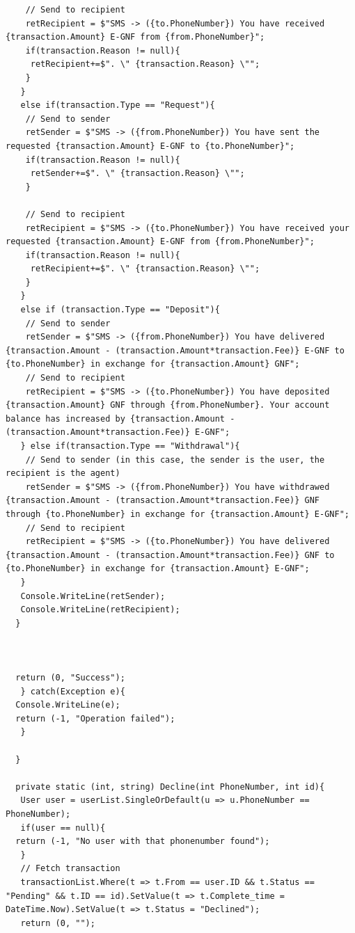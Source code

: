 \documentclass[11pt, a4paper]{article}
\begin{document}
\begin{appendices}
\begin{lstlisting}
    // Send to recipient
    retRecipient = $"SMS -> ({to.PhoneNumber}) You have received {transaction.Amount} E-GNF from {from.PhoneNumber}";
    if(transaction.Reason != null){
     retRecipient+=$". \" {transaction.Reason} \"";
    }
   }
   else if(transaction.Type == "Request"){
    // Send to sender
    retSender = $"SMS -> ({from.PhoneNumber}) You have sent the requested {transaction.Amount} E-GNF to {to.PhoneNumber}";
    if(transaction.Reason != null){
     retSender+=$". \" {transaction.Reason} \"";
    }

    // Send to recipient
    retRecipient = $"SMS -> ({to.PhoneNumber}) You have received your requested {transaction.Amount} E-GNF from {from.PhoneNumber}";
    if(transaction.Reason != null){
     retRecipient+=$". \" {transaction.Reason} \"";
    }
   }
   else if (transaction.Type == "Deposit"){
    // Send to sender
    retSender = $"SMS -> ({from.PhoneNumber}) You have delivered {transaction.Amount - (transaction.Amount*transaction.Fee)} E-GNF to {to.PhoneNumber} in exchange for {transaction.Amount} GNF";
    // Send to recipient
    retRecipient = $"SMS -> ({to.PhoneNumber}) You have deposited {transaction.Amount} GNF through {from.PhoneNumber}. Your account balance has increased by {transaction.Amount - (transaction.Amount*transaction.Fee)} E-GNF";
   } else if(transaction.Type == "Withdrawal"){
    // Send to sender (in this case, the sender is the user, the recipient is the agent)
    retSender = $"SMS -> ({from.PhoneNumber}) You have withdrawed {transaction.Amount - (transaction.Amount*transaction.Fee)} GNF through {to.PhoneNumber} in exchange for {transaction.Amount} E-GNF";
    // Send to recipient
    retRecipient = $"SMS -> ({to.PhoneNumber}) You have delivered {transaction.Amount - (transaction.Amount*transaction.Fee)} GNF to {to.PhoneNumber} in exchange for {transaction.Amount} E-GNF";
   }
   Console.WriteLine(retSender);
   Console.WriteLine(retRecipient);
  }



  return (0, "Success");
   } catch(Exception e){
  Console.WriteLine(e);
  return (-1, "Operation failed");
   }

  }

  private static (int, string) Decline(int PhoneNumber, int id){
   User user = userList.SingleOrDefault(u => u.PhoneNumber == PhoneNumber);
   if(user == null){
  return (-1, "No user with that phonenumber found");
   }
   // Fetch transaction
   transactionList.Where(t => t.From == user.ID && t.Status == "Pending" && t.ID == id).SetValue(t => t.Complete_time = DateTime.Now).SetValue(t => t.Status = "Declined");
   return (0, "");


\end{lstlisting}
\end{appendices}
\end{document}
